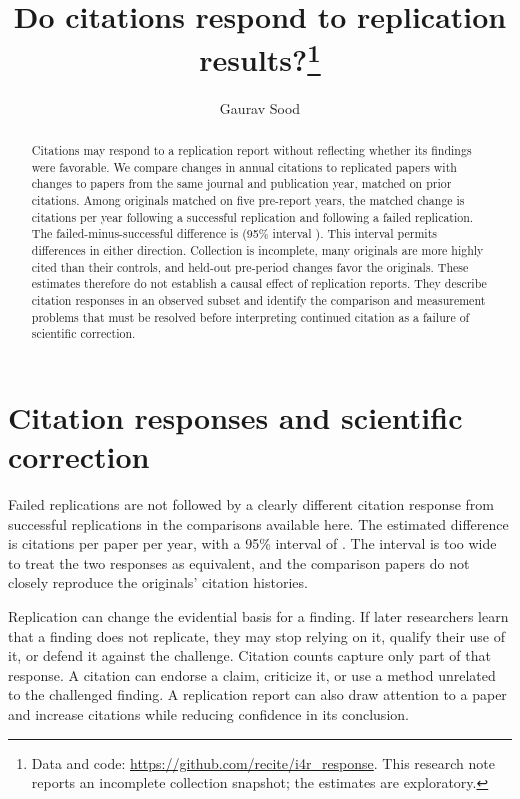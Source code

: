 \documentclass[11pt,letterpaper]{article}
\title{Do citations respond to replication results?\thanks{Data and code: \url{https://github.com/recite/i4r_response}. This research note reports an incomplete collection snapshot; the estimates are exploratory.}}
\author{Gaurav Sood}
\date{}
\begin{document}
\maketitle
\begin{abstract}
\noindent Citations may respond to a replication report without reflecting whether its findings were favorable. We compare changes in annual citations to replicated papers with changes to papers from the same journal and publication year, matched on prior citations. Among \MainDifferenceN{} originals matched on five pre-report years, the matched change is \MainSuccessfulEstimate{} citations per year following a successful replication and \MainFailedEstimate{} following a failed replication. The failed-minus-successful difference is \MainDifferenceEstimate{} (95\% interval \MainDifferenceInterval{}). This interval permits differences in either direction. Collection is incomplete, many originals are more highly cited than their controls, and held-out pre-period changes favor the originals. These estimates therefore do not establish a causal effect of replication reports. They describe citation responses in an observed subset and identify the comparison and measurement problems that must be resolved before interpreting continued citation as a failure of scientific correction.
\end{abstract}

\section{Citation responses and scientific correction}
Failed replications are not followed by a clearly different citation response from successful replications in the comparisons available here. The estimated difference is \MainDifferenceEstimate{} citations per paper per year, with a 95\% interval of \MainDifferenceInterval{}. The interval is too wide to treat the two responses as equivalent, and the comparison papers do not closely reproduce the originals' citation histories.

Replication can change the evidential basis for a finding. If later researchers learn that a finding does not replicate, they may stop relying on it, qualify their use of it, or defend it against the challenge. Citation counts capture only part of that response. A citation can endorse a claim, criticize it, or use a method unrelated to the challenged finding. A replication report can also draw attention to a paper and increase citations while reducing confidence in its conclusion.
\end{document}
